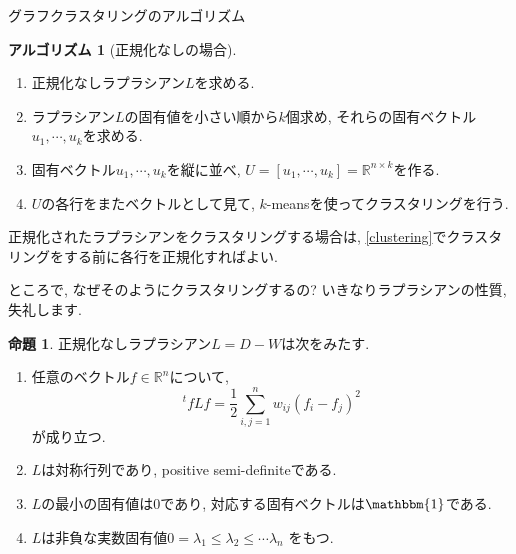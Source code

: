 \documentclass[dvipdfmx,11pt]{beamer}
\theoremstyle{definition}
\newtheorem{propo}{命題}
\newtheorem{alg}{アルゴリズム}
\begin{document}
\begin{frame}{グラフクラスタリングのアルゴリズム}
\begin{alg}[正規化なしの場合] 
\begin{enumerate}
\item 正規化なしラプラシアン$L$を求める.
\item ラプラシアン$L$の固有値を小さい順から$k$個求め, それらの固有ベクトル$u_1,\cdots,u_k$を求める. 
\item 固有ベクトル$u_1,\cdots,u_k$を縦に並べ, $U=[u_1,\cdots,u_k]= \mathbb{R} ^{n \times k}$を作る.
\item\label{clustering} $U$の各行をまたベクトルとして見て, $k$-meansを使ってクラスタリングを行う.
\end{enumerate}
\end{alg}
正規化されたラプラシアンをクラスタリングする場合は, \ref{clustering}でクラスタリングをする前に各行を正規化すればよい.
\end{frame}

\begin{frame}{ところで, なぜそのようにクラスタリングするの?}
いきなりラプラシアンの性質, 失礼します.
\begin{propo}
正規化なしラプラシアン$L = D - W$は次をみたす.
\begin{enumerate}
\item 任意のベクトル$f \in \mathbb{R}^n$について, 
$$^{t}f L f = \dfrac{1}{2}\displaystyle\sum _{i, j=1} ^n w_{ij} (f_i - f_j)^2$$
が成り立つ.
\item $L$は対称行列であり, positive semi-definiteである.
\item $L$の最小の固有値は$0$であり, 対応する固有ベクトルは$\mathbbm{1}$である.
\item $L$は非負な実数固有値$0 =\lambda _1 \leq \lambda_2 \leq \cdots \lambda_n$ をもつ.
\end{enumerate}
\end{propo}

\end{frame}
\end{document}
